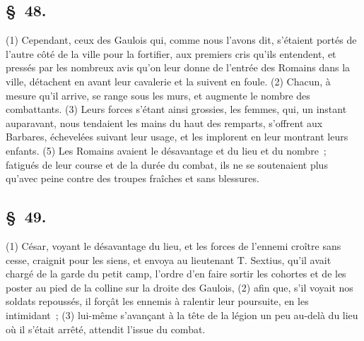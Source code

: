 \documentclass[french,twoside]{book} %
\begin{document}
\subsection[{§ 48.}]{ \textsc{§ 48.} }
\noindent (1) Cependant, ceux des Gaulois qui, comme nous l’avons dit, s’étaient portés de l’autre côté de la ville pour la fortifier, aux premiers cris qu’ils entendent, et pressés par les nombreux avis qu’on leur donne de l’entrée des Romains dans la ville, détachent en avant leur cavalerie et la suivent en foule. (2) Chacun, à mesure qu’il arrive, se range sous les murs, et augmente le nombre des combattants. (3) Leurs forces s’étant ainsi grossies, les femmes, qui, un instant auparavant, nous tendaient les mains du haut des remparts, s’offrent aux Barbares, échevelées suivant leur usage, et les implorent en leur montrant leurs enfants. (5) Les Romains avaient le désavantage et du lieu et du nombre ; fatigués de leur course et de la durée du combat, ils ne se soutenaient plus qu’avec peine contre des troupes fraîches et sans blessures.
\subsection[{§ 49.}]{ \textsc{§ 49.} }
\noindent (1) César, voyant le désavantage du lieu, et les forces de l’ennemi croître sans cesse, craignit pour les siens, et envoya au lieutenant T. Sextius, qu’il avait chargé de la garde du petit camp, l’ordre d’en faire sortir les cohortes et de les poster au pied de la colline sur la droite des Gaulois, (2) afin que, s’il voyait nos soldats repoussés, il forçât les ennemis à ralentir leur poursuite, en les intimidant ; (3) lui-même s’avançant à la tête de la légion un peu au-delà du lieu où il s’était arrêté, attendit l’issue du combat.
\end{document}
